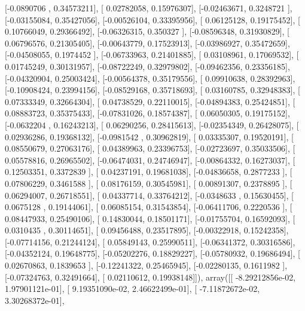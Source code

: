 \documentclass{article}
\begin{document}
       [-0.0890706 ,  0.34573211],
       [ 0.02782058,  0.15976307],
       [-0.02463671,  0.3248721 ],
       [-0.03155084,  0.35427056],
       [-0.00526104,  0.33395956],
       [ 0.06125128,  0.19175452],
       [ 0.10766049,  0.29366492],
       [-0.06326315,  0.350327  ],
       [-0.08596348,  0.31930829],
       [ 0.06796576,  0.21305405],
       [-0.00643779,  0.17523913],
       [-0.03986927,  0.35472659],
       [-0.04508055,  0.1974452 ],
       [-0.06733963,  0.21401885],
       [ 0.03108961,  0.17069532],
       [ 0.01745249,  0.30131957],
       [-0.08722249,  0.32979802],
       [-0.09462356,  0.23356185],
       [-0.04320904,  0.25003424],
       [-0.00564378,  0.35179556],
       [ 0.09910638,  0.28392963],
       [-0.10908424,  0.23994156],
       [-0.08529168,  0.35718693],
       [ 0.03160785,  0.32948383],
       [ 0.07333349,  0.32664304],
       [ 0.04738529,  0.22110015],
       [-0.04894383,  0.25424851],
       [ 0.08883723,  0.35375433],
       [-0.07831026,  0.18574387],
       [ 0.06050305,  0.19175152],
       [-0.0632204 ,  0.16243213],
       [ 0.06290256,  0.28415613],
       [-0.02354349,  0.26428075],
       [ 0.02936286,  0.19368132],
       [-0.0981542 ,  0.30962819],
       [ 0.03335307,  0.19520191],
       [ 0.08550679,  0.27063176],
       [ 0.04389963,  0.23396753],
       [-0.02723697,  0.35033506],
       [ 0.05578816,  0.26965502],
       [-0.06474031,  0.24746947],
       [-0.00864332,  0.16273037],
       [ 0.12503351,  0.3372839 ],
       [ 0.04237191,  0.19681038],
       [-0.04836658,  0.2877233 ],
       [ 0.07806229,  0.3461588 ],
       [ 0.08176159,  0.30545981],
       [ 0.00891307,  0.2378895 ],
       [ 0.06294007,  0.26718551],
       [ 0.04337714,  0.33764212],
       [-0.0348633 ,  0.15630455],
       [ 0.0675128 ,  0.19144061],
       [ 0.06085154,  0.31543854],
       [-0.06411706,  0.2220536 ],
       [ 0.08447933,  0.25490106],
       [ 0.14830044,  0.18501171],
       [-0.01755704,  0.16592093],
       [ 0.0310435 ,  0.30114651],
       [ 0.09456488,  0.23517895],
       [-0.00322918,  0.15242358],
       [-0.07714156,  0.21244124],
       [ 0.05849143,  0.25990511],
       [-0.06341372,  0.30316586],
       [-0.04352124,  0.19648775],
       [-0.05202276,  0.18829227],
       [-0.05780932,  0.19686494],
       [ 0.02670863,  0.1839653 ],
       [-0.12241322,  0.25465945],
       [-0.02280135,  0.1611982 ],
       [-0.07324763,  0.32491664],
       [ 0.02110612,  0.19938148]]), array([[ -8.29212856e-02,   1.97901121e-01],
       [  9.19351090e-02,   2.46622499e-01],
       [ -7.11872672e-02,   3.30268372e-01],
\end{document}
